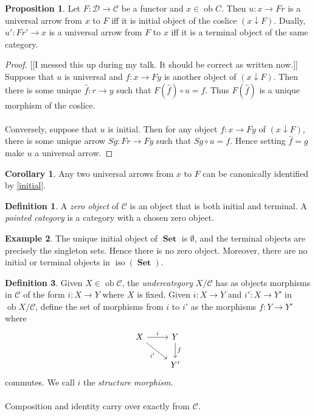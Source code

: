 \documentclass[10pt,letterpaper,cm]{nupset}
\theoremstyle{definition}
\newtheorem{definition}{Definition}
\newtheorem{exmp}[definition]{Example}
\theoremstyle{theorem}
\newtheorem{prop}[theorem]{Proposition}
\newtheorem{corollary}[theorem]{Corollary}
\theoremstyle{remark}
\newcommand{\1}{\mathbf{1}}
\renewcommand{\c}{\mathscr{C}}
\renewcommand{\d}{\mathscr{D}}
\newcommand{\0}{\vec 0}
\DeclareMathOperator{\ob}{ob}
\DeclareMathOperator{\iso}{iso}
\DeclareMathOperator{\set}{\mathbf{Set}}
\begin{document}
\begin{prop}
Let $F : \d \to \c$ be a functor and $x \in \ob C$. Then $u : x \to Fr$ is a universal arrow from $x$ to $F$ iff it is initial object of the coslice $(x \downarrow F)$. Dually, $u' : Fr' \to x$ is a universal arrow from $F$ to $x$  iff it is a terminal object of the same category.
\end{prop}
\begin{proof}{[[I messed this up during my talk. It should be correct as written now.]]}
Suppose that $u$ is universal and $f: x \to Fy$ is another object of $(x \downarrow F)$. Then there is some unique $\hat{f}: r \to y$ such that $F(\hat{f}) \circ u = f$. Thus $F(\hat{f})$ is a unique morphism of the coslice.
\\ \\Conversely, suppose that $u$ is initial. Then for any object $f: x \to Fy$ of $(x \downarrow F)$, there is some unique arrow $Sg : Fr \to Fy$ such that $Sg \circ u = f$. Hence setting $\hat{f} = g$ make $u$ a universal arrow.
\end{proof}

\begin{corollary}
Any two universal arrows from $x$ to $F$ can be canonically identified by \cref{initial}.
\end{corollary}

\begin{definition}
A \textit{zero object} of $\c$ is an object that is both initial and terminal. A \textit{pointed category} is a category with a chosen zero object. 
\end{definition}

\begin{exmp}
The unique initial object of $\set$ is $\emptyset$, and the terminal objects are precisely the singleton sets. Hence there is no zero object. Moreover, there are no initial or terminal objects in $\iso(\set)$.
\end{exmp}

\begin{definition}
Given $X \in \ob \c$, the \textit{undercategory} ${X}/{\c}$ has as objects morphisms in $\c$ of the form $i : X \to Y$ where $X$ is fixed. Given $i: X \to Y$ and  $i' : X \to Y'$ in $\ob {X}/{\c}$, define the set of morphisms from $i$ to $i'$ as the morphisms $f: Y \to Y'$ where
\[ \begin{tikzcd}
X \arrow[r, "i"] \arrow[swap, dr,  " i' "] & Y \arrow[d, "f"] \\%
 & Y'
\end{tikzcd}
\]
commutes. We call $i$ the \textit{structure morphism}.
\\ \\ Composition and identity carry over exactly from $\c$.
\end{definition}
\end{document}
